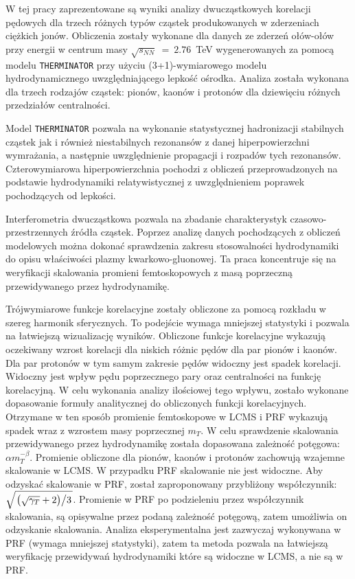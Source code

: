 
W tej pracy zaprezentowane są wyniki analizy dwucząstkowych korelacji pędowych dla trzech różnych typów cząstek produkowanych w zderzeniach ciężkich jonów.
Obliczenia zostały wykonane dla danych ze zderzeń ołów-ołów przy energii w centrum masy $\sqrt{s_{NN}}~=~2.76$~TeV wygenerowanych za pomocą modelu \verb|THERMINATOR| przy użyciu (3+1)-wymiarowego modelu hydrodynamicznego uwzględniającego lepkość ośrodka.
Analiza została wykonana dla trzech rodzajów cząstek: pionów, kaonów i protonów dla dziewięciu różnych przedziałów centralności.

Model \verb|THERMINATOR| pozwala na wykonanie statystycznej hadronizacji stabilnych cząstek jak i również niestabilnych rezonansów z danej hiperpowierzchni wymrażania, a następnie uwzględnienie propagacji i rozpadów tych rezonansów.
Czterowymiarowa hiperpowierzchnia pochodzi z obliczeń przeprowadzonych na podstawie hydrodynamiki relatywistycznej z uwzględnieniem poprawek pochodzących od lepkości.

Interferometria dwucząstkowa pozwala na zbadanie charakterystyk czasowo-przestrzennych źródła cząstek.
Poprzez analizę danych pochodzących z obliczeń modelowych można dokonać sprawdzenia zakresu stosowalności hydrodynamiki do opisu właściwości plazmy kwarkowo-gluonowej.
Ta praca koncentruje się na weryfikacji skalowania promieni femtoskopowych z masą poprzeczną przewidywanego przez hydrodynamikę.

Trójwymiarowe funkcje korelacyjne zostały obliczone za pomocą rozkładu w szereg harmonik sferycznych.
To podejście wymaga mniejszej statystyki i pozwala na łatwiejszą wizualizację wyników.
Obliczone funkcje korelacyjne wykazują oczekiwany wzrost korelacji dla niskich różnic pędów dla par pionów i kaonów.
Dla par protonów w tym samym zakresie pędów widoczny jest spadek korelacji.
Widoczny jest wpływ pędu poprzecznego pary oraz centralności na funkcję korelacyjną.
W celu wykonania analizy ilościowej tego wpływu, zostało wykonane dopasowanie formuły analitycznej do obliczonych funkcji korelacyjnych.
Otrzymane w ten sposób promienie femtoskopowe w LCMS i PRF wykazują spadek wraz z wzrostem masy poprzecznej $m_T$.
W celu sprawdzenie skalowania przewidywanego przez hydrodynamikę została dopasowana zależność potęgowa: $\alpha m_T^{-\beta}$.
Promienie obliczone dla pionów, kaonów i protonów zachowują wzajemne skalowanie w LCMS.
W przypadku PRF skalowanie nie jest widoczne.
Aby odzyskać skalowanie w PRF, został zaproponowany przybliżony współczynnik: $\sqrt{ \left. \left( \sqrt{\gamma_T} + 2 \right) \middle/ 3 \right. }$.
Promienie w PRF po podzieleniu przez współczynnik skalowania, są opisywalne przez podaną zależność potęgową, zatem umożliwia on odzyskanie skalowania.
Analiza eksperymentalna jest zazwyczaj wykonywana w PRF (wymaga mniejszej statystyki), zatem ta metoda pozwala na łatwiejszą weryfikację przewidywań hydrodynamiki które są widoczne w LCMS, a nie są w PRF.